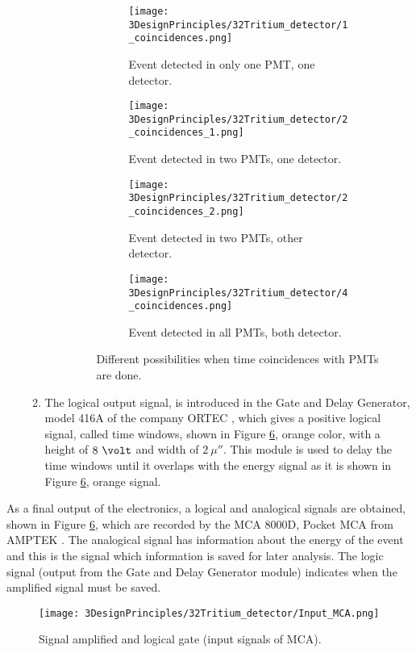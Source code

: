\begin{enumerate}
\begin{enumerate}
\begin{enumerate}
\begin{figure}
\centering
    \begin{subfigure}[b]{0.45\textwidth}
    \centering
    \texttt{[image: 3DesignPrinciples/32Tritium\_detector/1\_coincidences.png]}  
    \caption{Event detected in only one PMT, one detector.\label{subfig:signalInOnePMT}}
    \end{subfigure}
    \hfill
    \begin{subfigure}[b]{0.45\textwidth}
    \centering
    \texttt{[image: 3DesignPrinciples/32Tritium\_detector/2\_coincidences\_1.png]}  
    \caption{Event detected in two PMTs, one detector.\label{subfig:signalInTwoPMTOneDetector}}
    \end{subfigure}
    \hfill
    \begin{subfigure}[b]{0.45\textwidth}
    \centering
    \texttt{[image: 3DesignPrinciples/32Tritium\_detector/2\_coincidences\_2.png]}  
    \caption{Event detected in two PMTs, other detector.\label{subfig:signalInTwoPMTOtherDetector}}
    \end{subfigure}
    \hfill
    \begin{subfigure}[b]{0.45\textwidth}
    \centering
    \texttt{[image: 3DesignPrinciples/32Tritium\_detector/4\_coincidences.png]}  
    \caption{Event detected in all PMTs, both detector.\label{subfig:signalInAllPMTsBothDetector}}
    \end{subfigure}
 \caption{Different possibilities when time coincidences with PMTs are done.}
 \label{fig:DifferentCoincidences}
\end{figure}

\end{enumerate}

\item{} The logical output signal, is introduced in the Gate and Delay Generator, model 416A of the company ORTEC \cite{DataSheetGateAndDelay}, which gives a positive logical signal, called time windows, shown in Figure \ref{fig:InputSignalsMCA}, orange color, with a height of $8~\volt$ and width of $2~\mu\second$. This module is used to delay the time windows until it overlaps with the energy signal as it is shown in Figure \ref{fig:InputSignalsMCA}, orange signal.

\end{enumerate}

\end{enumerate}

As a final output of the electronics, a logical and analogical signals are obtained, shown in Figure \ref{fig:InputSignalsMCA}, which are recorded by the MCA 8000D, Pocket MCA from AMPTEK \cite{DataSheetMCA}. The analogical signal has information about the energy of the event and this is the signal which information is saved for later analysis. The logic signal (output from the Gate and Delay Generator module) indicates when the amplified signal must be saved.

\begin{figure}[htbp]
\centering
\texttt{[image: 3DesignPrinciples/32Tritium\_detector/Input\_MCA.png]}
\caption{Signal amplified and logical gate (input signals of MCA).\label{fig:InputSignalsMCA}}
\end{figure}